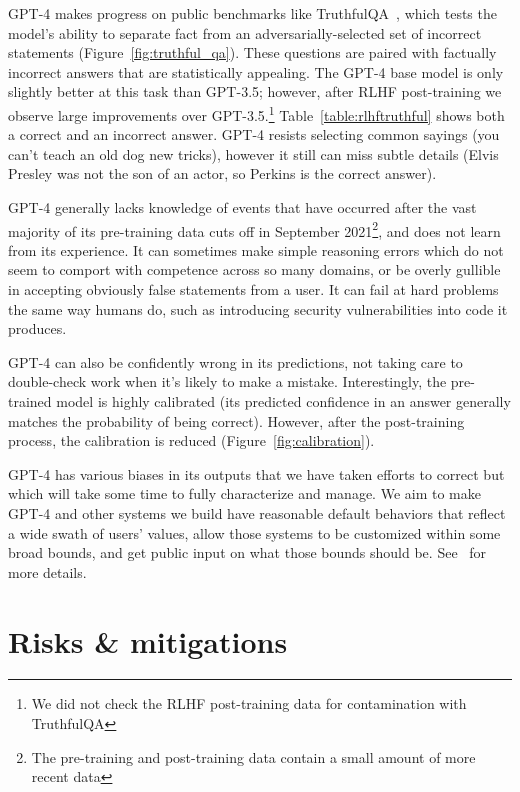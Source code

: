 GPT-4 makes progress on public benchmarks like TruthfulQA~\cite{lin-etal-2022-truthfulqa}, which tests the model's ability to separate fact from an adversarially-selected set of incorrect statements (Figure~\ref{fig:truthful_qa}). These questions are paired with factually incorrect answers that are statistically appealing. The GPT-4 base model is only slightly better at this task than GPT-3.5; however, after RLHF post-training we observe large improvements over GPT-3.5.\footnote{We did not check the RLHF post-training data for contamination with TruthfulQA} Table~\ref{table:rlhftruthful} shows both a correct and an incorrect answer. GPT-4 resists selecting common sayings (you can't teach an old dog new tricks), however it still can miss subtle details (Elvis Presley was not the son of an actor, so Perkins is the correct answer).

GPT-4 generally lacks knowledge of events that have occurred after the vast majority of its pre-training data cuts off in September 2021\footnote{The pre-training and post-training data contain a small amount of more recent data}, and does not learn from its experience. It can sometimes make simple reasoning errors which do not seem to comport with competence across so many domains, or be overly gullible in accepting obviously false statements from a user. It can fail at hard problems the same way humans do, such as introducing security vulnerabilities into code it produces.

GPT-4 can also be confidently wrong in its predictions, not taking care to double-check work when it's likely to make a mistake. Interestingly, the pre-trained model is highly calibrated (its predicted confidence in an answer generally matches the probability of being correct). However, after the post-training process, the calibration is reduced (Figure~\ref{fig:calibration}).

GPT-4 has various biases in its outputs that we have taken efforts to correct but which will take some time to fully characterize and manage. We aim to make GPT-4 and other systems we build have reasonable default behaviors that reflect a wide swath of users' values, allow those systems to be customized within some broad bounds, and get public input on what those bounds should be. See~\citet{openaibehaveblog} for more details.

\section{Risks \& mitigations}

